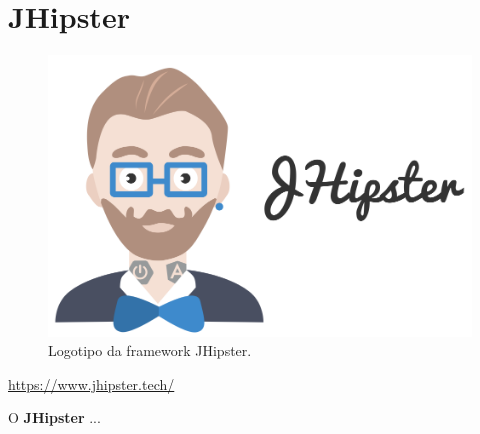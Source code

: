 \section{JHipster}
\label{subsec:jhipster}

\begin{figure}[H]
    \centering
    \includegraphics[scale=0.17]{images/jhipster.png}
    \caption{Logotipo da framework JHipster.}
    \label{fig:jhipster}
\end{figure}

\href{https://www.jhipster.tech/}{https://www.jhipster.tech/}

\hspace{5mm} O \textbf{JHipster} ...